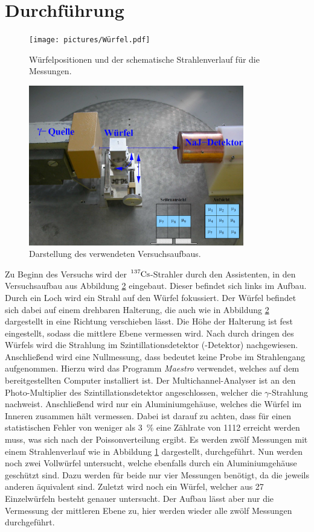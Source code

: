 \newpage
\section{Durchführung}
\label{sec:Durchführung}

\begin{figure}[htb]
  \centering
  \texttt{[image: pictures/Würfel.pdf]}
  \caption{Würfelpositionen und der schematische Strahlenverlauf für die Messungen.}
  \label{fig:wuerfel}
\end{figure}

\begin{figure}[htb]
  \centering
  \includegraphics[height=7.0cm]{content/pictures/Aufbau.png}
  \caption{Darstellung des verwendeten Versuchsaufbaus.\cite{anleitung}}
  \label{fig:Aufbau}
\end{figure}
Zu Beginn des Versuchs wird der $\ce{^137Cs}$-Strahler durch den Assistenten, in den Versuchsaufbau aus Abbildung \ref{fig:Aufbau} eingebaut. 
Dieser befindet sich links im Aufbau. 
Durch ein Loch wird ein Strahl auf den Würfel fokussiert.
Der Würfel befindet sich dabei auf einem drehbaren Halterung, die auch wie in Abbildung \ref{fig:Aufbau} dargestellt in eine Richtung verschieben lässt.
Die Höhe der Halterung ist fest eingestellt, sodass die mittlere Ebene vermessen wird.
Nach durch dringen des Würfels wird die Strahlung im Szintillationsdetektor (-Detektor) nachgewiesen.
Anschließend wird eine Nullmessung, dass bedeutet keine Probe im Strahlengang aufgenommen.
Hierzu wird das Programm \textit{Maestro} verwendet, welches auf dem bereitgestellten Computer installiert ist.
Der Multichannel-Analyser ist an den Photo-Multiplier des Szintillationsdetektor angeschlossen, welcher die $\gamma$-Strahlung nachweist.
Anschließend wird nur ein Aluminiumgehäuse, welches die Würfel im Inneren zusammen hält vermessen. Dabei ist darauf zu achten, dass für einen statistischen Fehler
von weniger als \SI{3}{\percent} eine Zählrate von \num{1112} erreicht werden muss, was sich nach der Poissonverteilung ergibt. Es werden zwölf Messungen mit einem Strahlenverlauf wie in Abbildung \ref{fig:wuerfel} dargestellt, durchgeführt.
Nun werden noch zwei Vollwürfel untersucht, welche ebenfalls durch ein Aluminiumgehäuse geschützt sind. Dazu werden für beide nur vier Messungen benötigt,
da die jeweils anderen äquivalent sind.
Zuletzt wird noch ein Würfel, welcher aus \num{27} Einzelwürfeln besteht genauer untersucht. Der Aufbau lässt aber nur die Vermessung der mittleren Ebene zu, hier werden 
wieder alle zwölf Messungen durchgeführt.
\FloatBarrier
\newpage